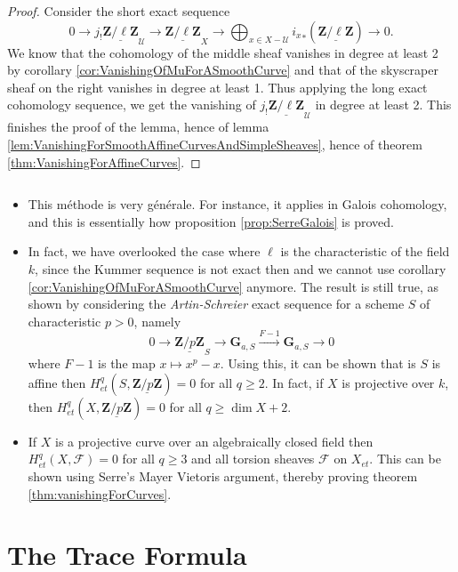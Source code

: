 \begin{proof}
Consider the short exact sequence
$$
0 \longrightarrow j_!\underline{\mathbf{Z}/\ell\mathbf{Z}}_\mathcal{U} \longrightarrow \underline{\mathbf{Z}/\ell\mathbf{Z}}_X \longrightarrow \bigoplus_{x \in X-\mathcal{U}} {i_x}_*(\underline{\mathbf{Z}/\ell\mathbf{Z}}) \longrightarrow 0.
$$
We know that the cohomology of the middle sheaf vanishes in degree at least 2 by corollary \ref{cor:VanishingOfMuForASmoothCurve} and that of the skyscraper sheaf on the right vanishes in degree at least 1. Thus applying the long exact cohomology sequence, we get the vanishing of $j_!\underline{\mathbf{Z}/\ell\mathbf{Z}}_\mathcal{U}$ in degree at least 2. This finishes the proof of the lemma, hence of lemma \ref{lem:VanishingForSmoothAffineCurvesAndSimpleSheaves}, hence of theorem \ref{thm:VanishingForAffineCurves}.
\end{proof}

\begin{remark} $ $
\begin{itemize}
\item 
This m\'ethode is very g\'en\'erale. For instance, it applies in Galois cohomology, and this is essentially how proposition \ref{prop:SerreGalois} is proved.
\item
In fact, we have overlooked the case where $\ell$ is the characteristic of the field $k$, since the Kummer sequence is not exact then and we cannot use corollary \ref{cor:VanishingOfMuForASmoothCurve} anymore. The result is still true, as shown by considering the \emph{Artin-Schreier} exact sequence for a scheme $S$ of characteristic $p >0$, namely
$$
0 \longrightarrow \underline{\mathbf{Z}/p\mathbf{Z}}_S \longrightarrow \mathbf{G}_{a,S} \xrightarrow{F-1} \mathbf{G}_{a,S} \longrightarrow 0
$$
where $F-1$ is the map $x \mapsto x^p - x$. Using this, it can be shown that is $S$ is affine then $H_{et}^q(S,\underline{\mathbf{Z}/p\mathbf{Z}}) = 0$ for all $q \geq 2$. In fact, if $X$ is projective over $k$, then $H_{et}^q(X,\underline{\mathbf{Z}/p\mathbf{Z}}) = 0$ for all $q \geq \dim X+2$.
\item
If $X$ is a projective curve over an algebraically closed field then $H_{et}^q(X,\mathcal{F}) = 0$ for all $q \geq 3$ and all torsion sheaves $\mathcal{F}$ on $X_{et}$. This can be shown using Serre's Mayer Vietoris argument, thereby proving theorem \ref{thm:vanishingForCurves}.
\end{itemize}
\end{remark}\section{The Trace Formula}

